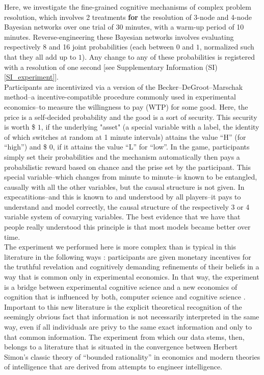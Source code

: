 Here, we investigate the fine-grained cognitive mechanisms of complex problem resolution, which involves 2 treatments {\bf for} the resolution of 3-node and 4-node Bayesian networks over one trial of 30 minutes, with a warm-up period of 10 minutes. Reverse-engineering these Bayesian networks involves evaluating respectively 8 and 16 joint probabilities (each between $0$ and $1$, normalized such that they all add up to $1$). Any change to any of these probabilities is registered with a resolution of one second [see Supplementary Information (SI) \ref{SI_experiment}].\\

Participants are incentivized via a version of the Becker–DeGroot–Marschak method--a incentive-compatible procedure commonly used in experimental economics--to measure the willingness to pay (WTP) for some good. Here, the price is a self-decided probability and the good is a sort of security.  This security is worth \$ $1$, if the underlying "asset" (a special variable with a label, the identity of which switches at random at 1 minute intervals) attains the value ``H'' (for ``high'') and \$ $0$, if it attains the value ``L'' for ``low''. In the game, participants simply set their probabilities and the mechanism automatically then pays a probabilistic reward based on chance and the prise set by the participant.  This special variable--which changes from minute to minute--is known to be entangled, causally with all the other variables, but the causal structure is not given.  In expecatitions--and this is known to and understood by all players--it pays to understand and model correctly, the causal structure of the respectively 3 or 4 variable system of covarying variables.  The best evidence that we have that people really understood this principle is that most models became better over time.  \\

The experiment we performed here is more complex than is typical in this literature in the following ways : participants are given monetary incentives for the truthful revelation and cognitively demanding refinements of their beliefs in a way that is common only in experimental economics.  In that way, the experiment is a bridge between experimental cognitive science and a new economics of cognition that is influenced by both, computer science and cognitive science \cite{Spiegler2016}. Important to this new literature is the explicit theoretical recognition of the seemingly obvious fact that information is not necessarily interpreted in the same way, even if all individuals are privy to the same exact information and only to that common information. The experiment from which our data stems, then, belongs to a literature that is situated in the convergence between Herbert Simon's classic theory of ``bounded rationality'' in economics \cite{Gigerenzer2001, Rubinstein98, tsang2008computational, simon1955behavioral} and modern theories of intelligence that are derived from attempts to engineer intelligence.\\  

